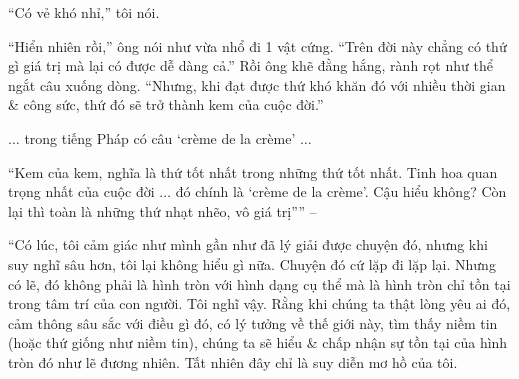 \documentclass{article}
\begin{document}
\begin{enumerate}
\begin{itemize}
		``Có vẻ khó nhỉ,'' tôi nói.
		
		``Hiển nhiên rồi,'' ông nói như vừa nhổ đi 1 vật cứng. ``Trên đời này chẳng có thứ gì giá trị mà lại có được dễ dàng cả.'' Rồi ông khẽ đằng hắng, rành rọt như thể ngắt câu xuống dòng. ``Nhưng, khi đạt được thứ khó khăn đó với nhiều thời gian \& công sức, thứ đó sẽ trở thành kem của cuộc đời.''
		
		$\ldots$ trong tiếng Pháp có câu `cr\`eme de la cr\`eme' $\ldots$
		
		``Kem của kem, nghĩa là thứ tốt nhất trong những thứ tốt nhất. Tinh hoa quan trọng nhất của cuộc đời $\ldots$ đó chính là `cr\`eme de la cr\`eme'. Cậu hiểu không? Còn lại thì toàn là những thứ nhạt nhẽo, vô giá trị'''' -- \cite[Kem, pp. 39--40]{Murakami_ngoi_1}
		
		``Có lúc, tôi cảm giác như mình gần như đã lý giải được chuyện đó, nhưng khi suy nghĩ sâu hơn, tôi lại không hiểu gì nữa. Chuyện đó cứ lặp đi lặp lại. Nhưng có lẽ, đó không phải là hình tròn với hình dạng cụ thể mà là hình tròn chỉ tồn tại trong tâm trí của con người. Tôi nghĩ vậy. Rằng khi chúng ta thật lòng yêu ai đó, cảm thông sâu sắc với điều gì đó, có lý tưởng về thế giới này, tìm thấy niềm tin (hoặc thứ giống như niềm tin), chúng ta sẽ hiểu \& chấp nhận sự tồn tại của hình tròn đó như lẽ đương nhiên. Tất nhiên đây chỉ là suy diễn mơ hồ của tôi.
		

\end{itemize}
\end{enumerate}
\end{document}
